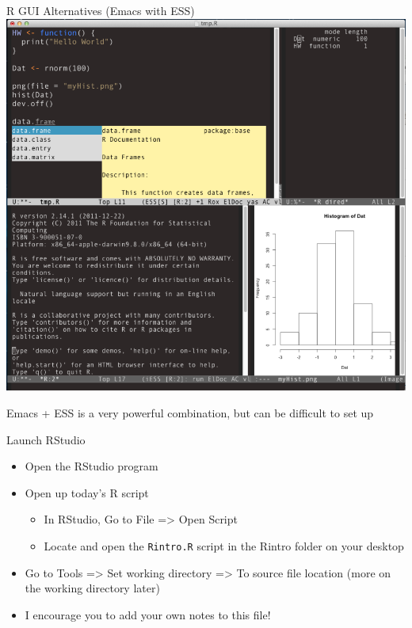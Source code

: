 \documentclass[table,smaller]{beamer}
\begin{document}
\begin{frame}[label=sec-2-4]{R GUI Alternatives (Emacs with ESS)}
\includegraphics[width=.65\textwidth]{images/emacs.png}

Emacs + ESS is a very powerful combination, but can be difficult to set up
\end{frame}


\begin{frame}[fragile,label=sec-2-5]{Launch RStudio}
 \begin{itemize}
\item Open the RStudio program

\item Open up today's R script

\begin{itemize}
\item In RStudio, Go to \alert{File => Open Script}

\item Locate and open the \texttt{Rintro.R} script in the Rintro folder on your desktop
\end{itemize}

\item Go to \alert{Tools => Set working directory => To source file location} (more on the working directory later)

\item I encourage you to add your own notes to this file!
\end{itemize}
\end{frame}
\end{document}
